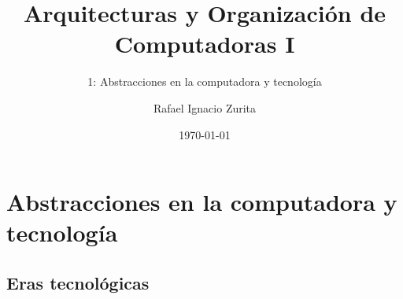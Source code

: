 \documentclass[aspectratio=169,compress]{beamer}
\title{Arquitecturas y Organización de Computadoras I}
\subtitle{1: Abstracciones en la computadora y tecnología}
\author{Rafael Ignacio Zurita}
\institute{Depto. Ingeniería de Computadoras}
\date{\today}
\begin{document}
\begin{frame}
\bigskip
  \maketitle
\end{frame}




\section{Abstracciones en la computadora y tecnología}

\subsection{Eras tecnológicas}
\end{document}
